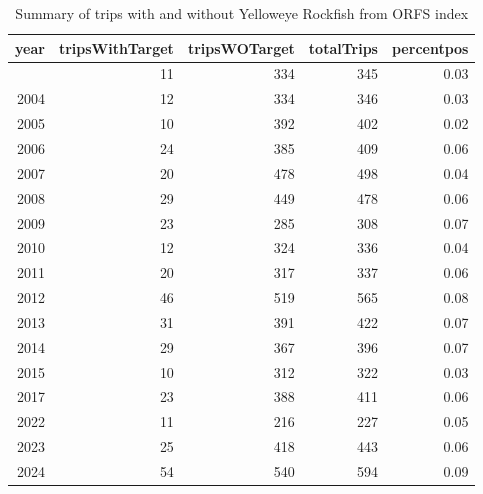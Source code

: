 \documentclass[
]{scrartcl}
\begin{document}
\begin{longtable}{rrrrr}

\caption{\label{tbl-yelloweye_percent_pos_ORFS}Summary of trips with and
without Yelloweye Rockfish from ORFS index}

\tabularnewline

\toprule
year & tripsWithTarget & tripsWOTarget & totalTrips & percentpos \\ 
\midrule\addlinespace[2.5pt]
2001 & 11 & 334 & 345 & 0.03 \\ 
2004 & 12 & 334 & 346 & 0.03 \\ 
2005 & 10 & 392 & 402 & 0.02 \\ 
2006 & 24 & 385 & 409 & 0.06 \\ 
2007 & 20 & 478 & 498 & 0.04 \\ 
2008 & 29 & 449 & 478 & 0.06 \\ 
2009 & 23 & 285 & 308 & 0.07 \\ 
2010 & 12 & 324 & 336 & 0.04 \\ 
2011 & 20 & 317 & 337 & 0.06 \\ 
2012 & 46 & 519 & 565 & 0.08 \\ 
2013 & 31 & 391 & 422 & 0.07 \\ 
2014 & 29 & 367 & 396 & 0.07 \\ 
2015 & 10 & 312 & 322 & 0.03 \\ 
2017 & 23 & 388 & 411 & 0.06 \\ 
2022 & 11 & 216 & 227 & 0.05 \\ 
2023 & 25 & 418 & 443 & 0.06 \\ 
2024 & 54 & 540 & 594 & 0.09 \\ 
\bottomrule

\end{longtable}

\endgroup

\begingroup
\fontsize{9.0pt}{10.8pt}\selectfont
\end{document}
